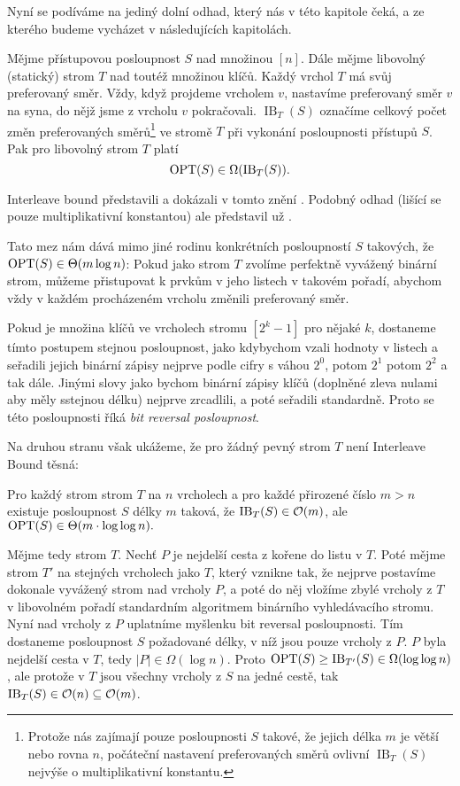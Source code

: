 Nyní se podíváme na jediný dolní odhad, který nás v této kapitole čeká, a ze kterého budeme vycházet v následujících kapitolách.

\def\ib{\operatorname{IB}}

\begin{veta}
Mějme přístupovou posloupnost $S$ nad množinou $[n]$. Dále mějme libovolný
(statický) strom $T$ nad toutéž množinou klíčů. Každý vrchol $T$ má svůj
preferovaný směr. Vždy, když projdeme vrcholem $v$, nastavíme preferovaný směr
$v$ na syna, do nějž jsme z vrcholu $v$ pokračovali. $\ib_T(S)$ označíme
celkový počet změn preferovaných směrů\footnote{Protože nás zajímají pouze
posloupnosti $S$ takové, že jejich délka $m$ je větší nebo rovna $n$, počáteční
nastavení preferovaných směrů ovlivní $\ib_T(S)$ nejvýše o multiplikativní
konstantu.} ve stromě $T$ při vykonání posloupnosti přístupů $S$. Pak pro
libovolný strom $T$ platí $$\opt(S) \in \Omega(\ib_T(S)).$$ 
\end{veta}

Interleave bound představili a dokázali v tomto znění \citet{tango}. Podobný odhad (lišící se pouze multiplikativní konstantou) ale představil už \citet{interleave}.

Tato mez nám dává mimo jiné rodinu konkrétních posloupností $S$ takových, že
$\operatorname{OPT}(S)\in\Theta(m\log n)$: Pokud jako strom $T$ zvolíme perfektně vyvážený
binární strom, můžeme přistupovat k prvkům v jeho listech v takovém pořadí,
abychom vždy v každém procházeném vrcholu změnili preferovaný směr.

Pokud je množina klíčů ve vrcholech stromu $[2^k-1]$ pro nějaké $k$, dostaneme
tímto postupem stejnou posloupnost, jako kdybychom vzali hodnoty v listech a
seřadili jejich binární zápisy nejprve podle cifry s váhou $2^0$, potom $2^1$
potom $2^2$ a tak dále. Jinými slovy jako bychom binární zápisy klíčů (doplněné
zleva nulami aby měly sstejnou délku) nejprve zrcadlili, a poté seřadili
standardně. Proto se této posloupnosti říká \emph{bit reversal posloupnost}.

Na druhou stranu však ukážeme, že pro žádný pevný strom $T$ není Interleave Bound těsná:
\begin{tvrz}
Pro každý strom strom $T$ na $n$ vrcholech a pro každé přirozené číslo $m>n$ existuje posloupnost $S$ délky $m$ taková, že $\ib_T(S) \in \o(m)$, ale $\operatorname{OPT}(S) \in \Theta(m\cdot\log\log n).$ 
\end{tvrz}

\begin{dukaz}
Mějme tedy strom $T$. Nechť $P$ je nejdelší cesta z kořene do listu v $T$. Poté
mějme strom $T'$ na stejných vrcholech jako $T$, který vznikne tak, že nejprve
postavíme dokonale vyvážený strom nad vrcholy $P$, a poté do něj vložíme zbylé
vrcholy z $T$ v libovolném pořadí standardním algoritmem binárního
vyhledávacího stromu. Nyní nad vrcholy z $P$ uplatníme myšlenku bit reversal
posloupnosti. Tím dostaneme posloupnost $S$ požadované délky, v níž jsou pouze
vrcholy z $P$. $P$ byla nejdelší cesta v $T$, tedy $|P|\in \Omega(\log n)$.
Proto $\opt(S)\geq \ib_{T'}(S) \in \Omega (\log\log n)$, ale protože v $T$ jsou
všechny vrcholy z $S$ na jedné cestě, tak $\ib_T(S) \in \o(n) \subseteq \o(m)$.
\end{dukaz}

